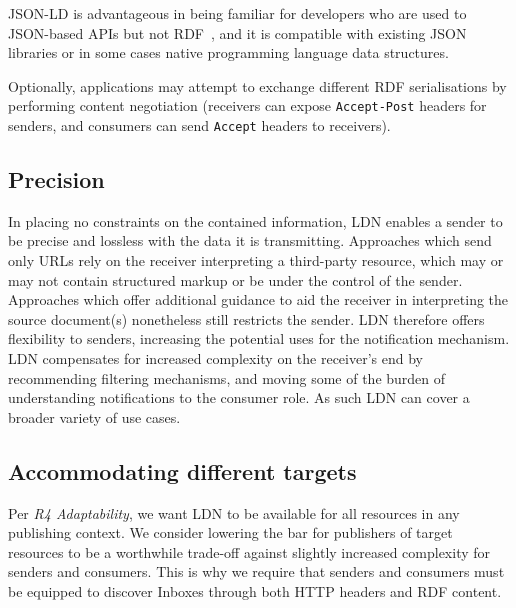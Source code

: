 \documentclass[a4paper]{llncs}
\begin{document}
                                        JSON-LD is advantageous in being familiar for developers who are \empty used to JSON-based APIs but not RDF~\cite{ref-20}, and it is compatible with existing JSON libraries or in some cases native programming language data structures.



\par Optionally, applications may attempt to exchange different RDF serialisations by performing content negotiation (receivers can expose {\tt Accept-Post} headers for senders, and consumers can send {\tt Accept} headers to receivers).




                                \subsection{Precision}
  \label{precision}



\par In placing no constraints on the contained information, LDN enables a sender to be precise and lossless with the data it is transmitting. Approaches which send only URLs rely on the receiver interpreting a third-party resource, which may or may not contain structured markup or be under the control of the sender. Approaches which offer additional guidance to aid the receiver in interpreting the source document(s) nonetheless still restricts the sender. LDN therefore offers flexibility to senders, increasing the potential uses for the notification mechanism. LDN compensates for increased complexity on the receiver’s end by recommending filtering mechanisms, and moving some of the burden of understanding notifications to the consumer role. As such LDN can cover a broader variety of use cases.




                                \subsection{Accommodating different targets}
  \label{accommodating-different-targets}



\par Per {\em R4 Adaptability}, we want LDN to be available for all resources in any publishing context. We consider lowering the bar for publishers of target resources to be a worthwhile trade-off against slightly increased complexity for senders and consumers. This is why we require that senders and consumers must be equipped to discover Inboxes through both HTTP headers and RDF content.
\end{document}
